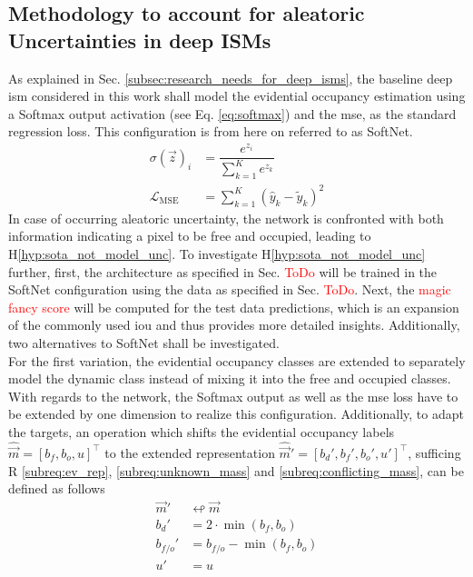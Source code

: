 \subsection{Methodology to account for aleatoric Uncertainties in deep ISMs}
\label{subsec:method_al_uncert_in_deep_isms}
As explained in Sec. \ref{subsec:research_needs_for_deep_isms}, the baseline deep \gls{ism} considered in this work shall model the evidential occupancy estimation using a Softmax output activation (see Eq. \ref{eq:softmax}) and the \gls{mse}, as the standard regression loss. This configuration is from here on referred to as SoftNet. 
\begin{align}
	\label{eq:softmax}
	\sigma(\vec{z})_i &= \dfrac{e^{z_i}}{\sum_{k=1}^{K}e^{z_k}}\\
	\label{eq:mse}
	\mathcal{L}_{\text{MSE}} &= \sum_{k=1}^{K}(\hat{y}_k - \tilde{y}_k)^2
\end{align}
In case of occurring aleatoric uncertainty, the network is confronted with both information indicating a pixel to be free and occupied, leading to H\ref{hyp:sota_not_model_unc}. To investigate H\ref{hyp:sota_not_model_unc} further, first, the architecture as specified in Sec. \textcolor{red}{ToDo} will be trained in the SoftNet configuration using the data as specified in Sec. \textcolor{red}{ToDo}. Next, the \textcolor{red}{magic fancy score} will be computed for the test data predictions, which is an expansion of the commonly used \gls{iou} and thus provides more detailed insights. Additionally, two alternatives to SoftNet shall be investigated. 
\\
For the first variation, the evidential occupancy classes are extended to separately model the dynamic class instead of mixing it into the free and occupied classes. With regards to the network, the Softmax output as well as the \gls{mse} loss have to be extended by one dimension to realize this configuration. Additionally, to adapt the targets, an operation which shifts the evidential occupancy labels $\hat{\vec{m}}=[b_f,b_o,u]^\top$ to the extended representation $\hat{\vec{m}}'=[b_d',b_f',b_o',u']^\top$, sufficing R \ref{subreq:ev_rep}, \ref{subreq:unknown_mass} and \ref{subreq:conflicting_mass}, can be defined as follows
\begin{align}
	\label{eq:extend_shift}
	\vec{m}' &\looparrowleft \vec{m}\\
	b_d' &= 2\cdot \min(b_f,b_o)\\
	b_{f/o}' &= b_{f/o} - \min(b_f,b_o)\\
	u' &= u
\end{align}

